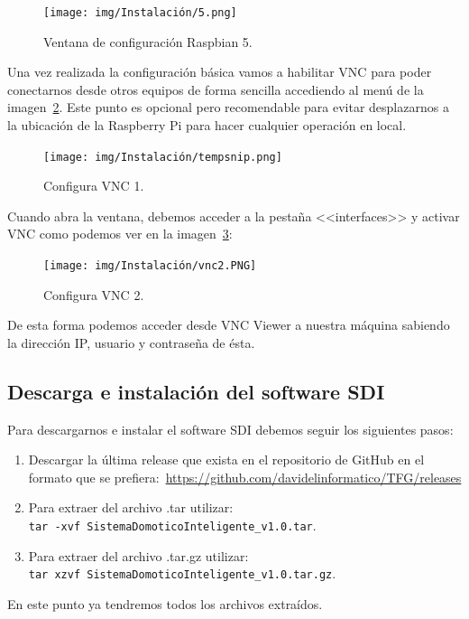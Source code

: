 \begin{figure}[h]
\centering
\texttt{[image: img/Instalación/5.png]}
\caption{Ventana de configuración Raspbian 5.}\label{Instala5}
\end{figure}

\newpage{\ }\thispagestyle{empty}
\newpage{\ }\thispagestyle{empty}
\newpage{\ }\thispagestyle{empty}
Una vez realizada la configuración básica vamos a habilitar VNC para poder conectarnos desde otros equipos de forma sencilla accediendo al menú de la imagen~\ref{VNC1}. Este punto es opcional pero recomendable para evitar desplazarnos a la ubicación de la Raspberry Pi para hacer cualquier operación en local.

\begin{figure}[h]
\centering
\texttt{[image: img/Instalación/tempsnip.png]}
\caption{Configura VNC 1.}\label{VNC1}
\end{figure}

Cuando abra la ventana, debemos acceder a la pestaña <<interfaces>> y activar VNC como podemos ver en la imagen~\ref{VNC2}:

\begin{figure}[h]
\centering
\texttt{[image: img/Instalación/vnc2.PNG]}
\caption{Configura VNC 2.}\label{VNC2}
\end{figure}

De esta forma podemos acceder desde VNC Viewer a nuestra máquina sabiendo la dirección IP, usuario y contraseña de ésta.

\subsection{Descarga e instalación del software SDI}
Para descargarnos e instalar el software SDI debemos seguir los siguientes pasos:

\begin{enumerate}
    \item Descargar la última release que exista en el repositorio de GitHub en el formato que se prefiera:~\url{https://github.com/davidelinformatico/TFG/releases}
    \item Para extraer del archivo .tar utilizar:~\\ \texttt{tar -xvf SistemaDomoticoInteligente\_v1.0.tar}.
    \item Para extraer del archivo .tar.gz utilizar:~\\ \texttt{tar xzvf SistemaDomoticoInteligente\_v1.0.tar.gz}.
\end{enumerate}
En este punto ya tendremos todos los archivos extraídos.

